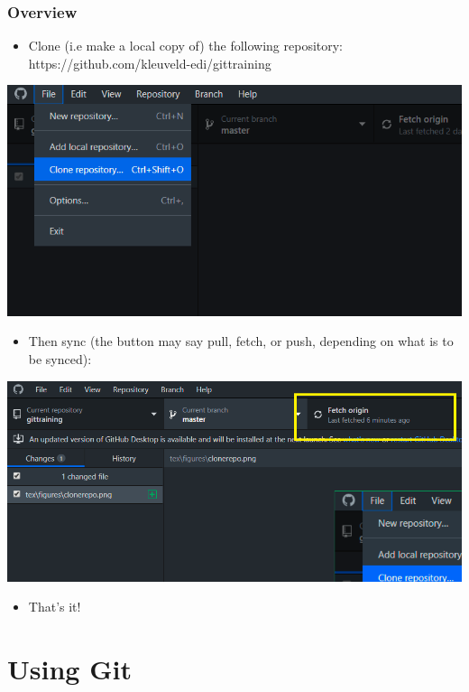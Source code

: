 \documentclass{beamer}
\begin{document}
\begin{frame}
\frametitle{Overview}
	\begin{itemize}
			\item Clone (i.e make a local copy of) the following repository: https://github.com/kleuveld-edi/gittraining
	\end{itemize}
	\hfill\includegraphics[width=0.5\linewidth]{figures/clonerepo.png}\hfill\strut
	\begin{itemize}
			\item Then sync (the button may say pull, fetch, or push, depending on what is to be synced):
	\end{itemize}
	\hfill\includegraphics[width=0.5\linewidth]{figures/fetch.png}\hfill\strut
	\begin{itemize}
			\item That's it!
	\end{itemize}
\end{frame}

\section{Using Git} %
\end{document}
